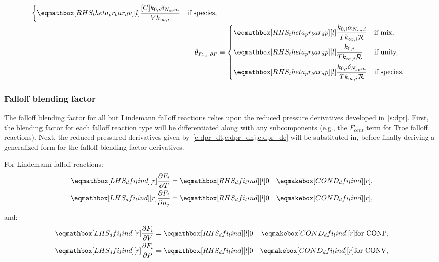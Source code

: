 \documentclass[12pt]{article}
\newcommand{\ns}{N_{sp}}
\newcommand{\conp}{CONP}
\newcommand{\conv}{CONV}
\newcommand{\dconp}{\ifmmode\text{for \conp,}\else for \conp,\fi}
\newcommand{\dconv}{\ifmmode\text{for \conv,}\else for \conv.\fi}
\newcommand{\Ru}{\mathcal{R}}
\begin{document}
\begin{align}
\begin{dcases}
  \rhs{theta_pr_bar_dv}{\frac{[C] k_{0, i} \delta_{\ns m}}{V k_{\infty, i}}} & \text{if species,}
 \end{dcases} \\
 \label{e:dpr_theta_dp}
 \bar{\theta}_{P_{r, i}, \partial P} &=
 \begin{dcases}
  \rhs{theta_pr_bar_dp}{\frac{k_{0, i} \alpha_{\ns,i}}{T k_{\infty, i} \Ru}} & \text{if mix,} \\
  \rhs{theta_pr_bar_dp}{\frac{k_{0, i}}{T k_{\infty, i} \Ru}} & \text{if unity,}  \\
  \rhs{theta_pr_bar_dp}{\frac{k_{0, i} \delta_{\ns m}}{T k_{\infty, i} \Ru}} & \text{if species,}
 \end{dcases}
\end{align}


\subsubsection{Falloff blending factor}
\label{s:dfi}

The falloff blending factor for all but Lindemann falloff reactions relies upon the reduced pressure derivatives developed in~\cref{s:dpr}.
First, the blending factor for each falloff reaction type will be differentiated along with any subcomponents (e.g., the $F_{cent}$ term for Troe falloff reactions).
Next, the reduced pressured derivatives given by~\cref{e:dpr_dt,e:dpr_dnj,e:dpr_de} will be substituted in, before finally deriving a generalized form for the falloff blending factor derivatives.

For Lindemann falloff reactions:
\begin{align}
 \lhs{dfi_lind}{\frac{\partial F_{i} }{\partial T }} &= \rhs{dfi_lind}{0} & \cond{dfi_lind}{,} \label{e:dfi_lind_dt} \\
 \lhs{dfi_lind}{\frac{\partial F_{i} }{\partial n_j }} &= \rhs{dfi_lind}{0} & \cond{dfi_lind}{,} \label{e:dfi_lind_dnj}
\end{align}
and:
\begin{subequations}
 \label{e:dfi_lind_de}
 \begin{align}
  \lhs{dfi_lind}{\frac{\partial F_{i} }{\partial V }} &= \rhs{dfi_lind}{0} & \cond{dfi_lind}{\dconp} \\
  \lhs{dfi_lind}{\frac{\partial F_{i} }{\partial P }} &= \rhs{dfi_lind}{0} & \cond{dfi_lind}{\dconv}
 \end{align}
\end{subequations}
\end{document}
